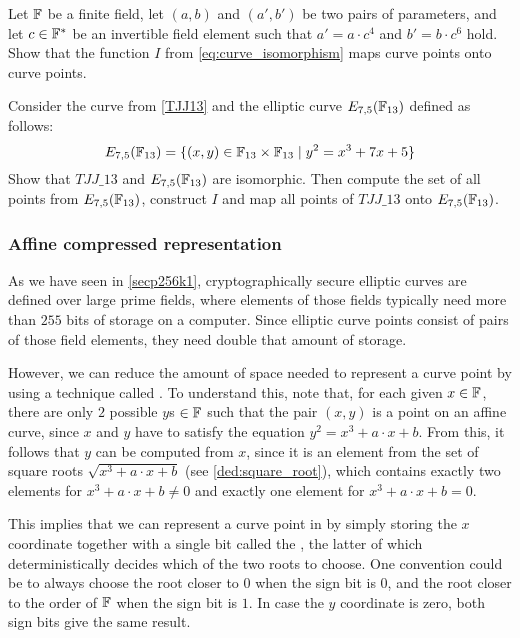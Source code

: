 \begin{exercise}
Let $\mathbb{F}$ be a finite field, let $(a,b)$ and $(a',b')$ be two pairs of parameters, and let $c\in \mathbb{F}^*$ be an invertible field element such that $a' = a\cdot c^4$ and $b' = b\cdot c^6$ hold. Show that the function $I$ from \eqref{eq:curve_isomorphism} maps curve points onto curve points.
\end{exercise}

\begin{exercise}
\label{ex:isomorphic_TJJ13} Consider the  curve from \examplename{} \ref{TJJ13} and the elliptic curve $E_{7,5}(\mathbb{F}_{13})$ defined as follows:
\begin{equation}
E_{7,5}(\mathbb{F}_{13}) = \{ (x,y)\in \mathbb{F}_{13}\times \mathbb{F}_{13}\;|\; y^2 = x^3 + 7x +5\}
\end{equation}
Show that $TJJ\_13$ and $E_{7,5}(\mathbb{F}_{13})$ are isomorphic. Then compute the set of all points from $E_{7,5}(\mathbb{F}_{13})$, construct $I$ and map all points of $TJJ\_13$ onto $E_{7,5}(\mathbb{F}_{13})$.
\end{exercise}

\subsubsection{Affine compressed representation}
\label{sec:affine_point_compression}
As we have seen in \examplename{} \ref{secp256k1}, cryptographically secure elliptic curves are defined over large prime fields, where elements of those fields typically need more than $255$ bits of storage on a computer. Since elliptic curve points consist of pairs of those field elements, they need double that amount of storage.

However, we can reduce the amount of space needed to represent a curve point by using a technique called . To understand this, note that, for each given $x\in\mathbb{F}$, there are only $2$ possible $y$s $\in \mathbb{F}$ such that the pair $(x,y)$ is a point on an affine  curve, since $x$ and $y$ have to satisfy the equation $y^2 = x^3 + a\cdot x + b$. From this, it follows that $y$ can be computed from $x$, since it is an element from the set of square roots $\sqrt{x^3 + a\cdot x +b}$ (see \ref{ded:square_root}), which contains exactly two elements for $x^3 + a\cdot x +b\neq 0$ and exactly one element for $x^3 + a\cdot x +b=0$. 

This implies that we can represent a curve point in  by simply storing the $x$ coordinate together with a single bit called the , the latter of which deterministically decides which of the two roots to choose. One convention could be to always choose the root closer to $0$ when the sign bit is $0$, and the root closer to the order of $\mathbb{F}$ when the sign bit is $1$. In case the $y$ coordinate is zero, both sign bits give the same result.

